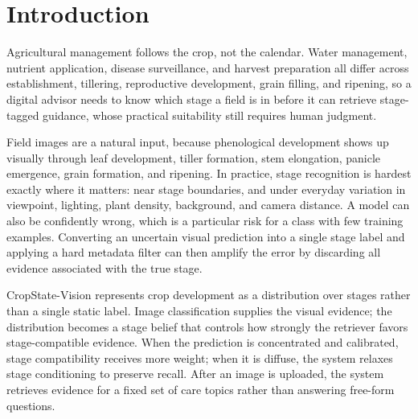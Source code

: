 \documentclass[conference,a4paper]{IEEEtran}
\begin{document}
\section{Introduction}

Agricultural management follows the crop, not the calendar. Water management, nutrient application, disease surveillance, and harvest preparation all differ across establishment, tillering, reproductive development, grain filling, and ripening, so a digital advisor needs to know which stage a field is in before it can retrieve stage-tagged guidance, whose practical suitability still requires human judgment.

Field images are a natural input, because phenological development shows up visually through leaf development, tiller formation, stem elongation, panicle emergence, grain formation, and ripening. In practice, stage recognition is hardest exactly where it matters: near stage boundaries, and under everyday variation in viewpoint, lighting, plant density, background, and camera distance. A model can also be confidently wrong, which is a particular risk for a class with few training examples. Converting an uncertain visual prediction into a single stage label and applying a hard metadata filter can then amplify the error by discarding all evidence associated with the true stage.

CropState-Vision represents crop development as a distribution over stages rather than a single static label. Image classification supplies the visual evidence; the distribution becomes a stage belief that controls how strongly the retriever favors stage-compatible evidence. When the prediction is concentrated and calibrated, stage compatibility receives more weight; when it is diffuse, the system relaxes stage conditioning to preserve recall. After an image is uploaded, the system retrieves evidence for a fixed set of care topics rather than answering free-form questions.
\end{document}
